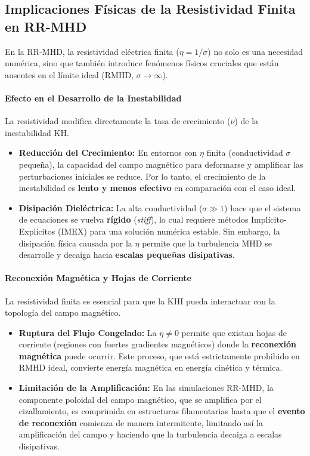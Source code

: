 \subsection{Implicaciones Físicas de la Resistividad Finita en RR-MHD}

En la RR-MHD, la resistividad eléctrica finita ($\eta = 1/\sigma$) no solo es una necesidad numérica, sino que también introduce fenómenos físicos cruciales que están ausentes en el límite ideal (RMHD, $\sigma \to \infty$).

\paragraph{Efecto en el Desarrollo de la Inestabilidad}
La resistividad modifica directamente la tasa de crecimiento ($\nu$) de la inestabilidad KH.
\begin{itemize}
    \item \textbf{Reducción del Crecimiento:} En entornos con $\eta$ finita (conductividad $\sigma$ pequeña), la capacidad del campo magnético para deformarse y amplificar las perturbaciones iniciales se reduce. Por lo tanto, el crecimiento de la inestabilidad es \textbf{lento y menos efectivo} en comparación con el caso ideal.
    \item \textbf{Disipación Dieléctrica:} La alta conductividad ($\sigma \gg 1$) hace que el sistema de ecuaciones se vuelva \textbf{rígido} (\textit{stiff}), lo cual requiere métodos Implícito-Explícitos (IMEX) para una solución numérica estable. Sin embargo, la disipación física causada por la $\eta$ permite que la turbulencia MHD se desarrolle y decaiga hacia \textbf{escalas pequeñas disipativas}.
\end{itemize}

\paragraph{Reconexión Magnética y Hojas de Corriente}
La resistividad finita es esencial para que la KHI pueda interactuar con la topología del campo magnético.
\begin{itemize}
    \item \textbf{Ruptura del Flujo Congelado:} La $\eta \ne 0$ permite que existan hojas de corriente (regiones con fuertes gradientes magnéticos) donde la \textbf{reconexión magnética} puede ocurrir. Este proceso, que está estrictamente prohibido en RMHD ideal, convierte energía magnética en energía cinética y térmica.
    \item \textbf{Limitación de la Amplificación:} En las simulaciones RR-MHD, la componente poloidal del campo magnético, que se amplifica por el cizallamiento, es comprimida en estructuras filamentarias hasta que el \textbf{evento de reconexión} comienza de manera intermitente, limitando así la amplificación del campo y haciendo que la turbulencia decaiga a escalas disipativas.
\end{itemize}

